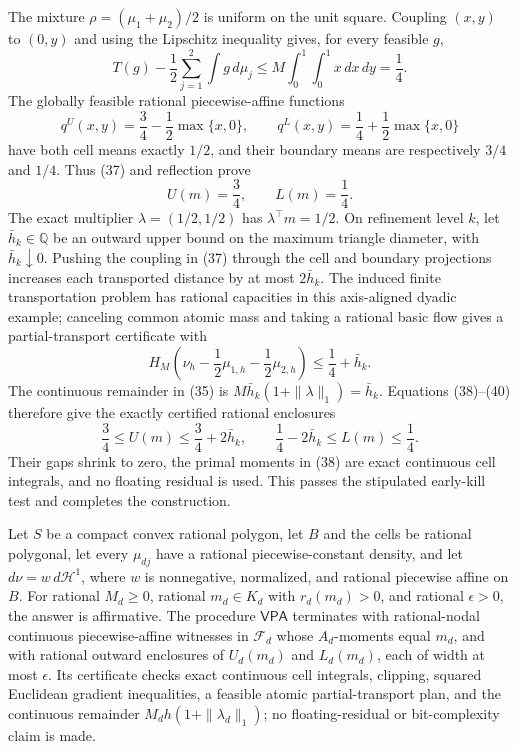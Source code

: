 The mixture \(\rho=(\mu_1+\mu_2)/2\) is uniform on the unit square.  Coupling
\((x,y)\) to \((0,y)\) and using the Lipschitz inequality gives, for every
feasible \(g\),
\[
 T(g)-\frac12\sum_{j=1}^2\int g\,d\mu_j
 \le M\int_0^1\int_0^1x\,dx\,dy=\frac14.                   \tag{37}
\]
The globally feasible rational piecewise-affine functions
\[
 q^U(x,y)=\frac34-\frac12\max\{x,0\},
 \qquad
 q^L(x,y)=\frac14+\frac12\max\{x,0\}                       \tag{38}
\]
have both cell means exactly \(1/2\), and their boundary means are respectively
\(3/4\) and \(1/4\).  Thus (37) and reflection prove
\[
 U(m)=\frac34,
 \qquad L(m)=\frac14.                                      \tag{39}
\]
The exact multiplier \(\lambda=(1/2,1/2)\) has
\(\lambda^\top m=1/2\).  On refinement level \(k\), let
\(\bar h_k\in\mathbb Q\) be an outward upper bound on the maximum triangle
diameter, with \(\bar h_k\downarrow0\).  Pushing the coupling in (37) through
the cell and boundary projections increases each transported distance by at
most \(2\bar h_k\).  The induced finite transportation problem has rational
capacities in this axis-aligned dyadic example; canceling common atomic mass
and taking a rational basic flow gives a partial-transport certificate with
\[
 H_M\!\left(\nu_h-\frac12\mu_{1,h}-\frac12\mu_{2,h}\right)
 \le\frac14+\bar h_k.                                      \tag{40}
\]
The continuous remainder in (35) is
\(M\bar h_k(1+\|\lambda\|_1)=\bar h_k\).  Equations
(38)--(40) therefore give the exactly certified rational enclosures
\[
 \frac34\le U(m)\le\frac34+2\bar h_k,
 \qquad
 \frac14-2\bar h_k\le L(m)\le\frac14.                      \tag{41}
\]
Their gaps shrink to zero, the primal moments in (38) are exact continuous
cell integrals, and no floating residual is used.  This passes the stipulated
early-kill test and completes the construction.

Let \(S\) be a compact convex rational polygon, let \(B\) and the cells be
rational polygonal, let every \(\mu_{dj}\) have a rational piecewise-constant
density, and let \(d\nu=w\,d\mathcal H^1\), where \(w\) is nonnegative,
normalized, and rational piecewise affine on \(B\).  For rational \(M_d\ge0\),
rational \(m_d\in K_d\) with \(r_d(m_d)>0\), and rational \(\epsilon>0\), the
answer is affirmative.  The procedure \(\mathsf{VPA}\) terminates with
rational-nodal continuous piecewise-affine witnesses in \(\mathcal F_d\) whose
\(A_d\)-moments equal \(m_d\), and with rational outward enclosures of
\(U_d(m_d)\) and \(L_d(m_d)\), each of width at most \(\epsilon\).  Its
certificate checks exact continuous cell integrals, clipping, squared Euclidean
gradient inequalities, a feasible atomic partial-transport plan, and the
continuous remainder \(M_dh(1+\|\lambda_d\|_1)\); no floating-residual or
bit-complexity claim is made.


